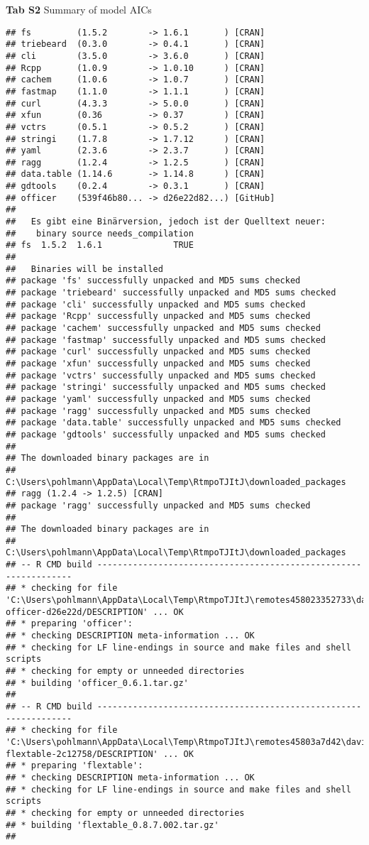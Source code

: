 \documentclass[
]{article}
\begin{document}
\textbf{Tab S2} Summary of model AICs

\begin{verbatim}
## fs         (1.5.2        -> 1.6.1       ) [CRAN]
## triebeard  (0.3.0        -> 0.4.1       ) [CRAN]
## cli        (3.5.0        -> 3.6.0       ) [CRAN]
## Rcpp       (1.0.9        -> 1.0.10      ) [CRAN]
## cachem     (1.0.6        -> 1.0.7       ) [CRAN]
## fastmap    (1.1.0        -> 1.1.1       ) [CRAN]
## curl       (4.3.3        -> 5.0.0       ) [CRAN]
## xfun       (0.36         -> 0.37        ) [CRAN]
## vctrs      (0.5.1        -> 0.5.2       ) [CRAN]
## stringi    (1.7.8        -> 1.7.12      ) [CRAN]
## yaml       (2.3.6        -> 2.3.7       ) [CRAN]
## ragg       (1.2.4        -> 1.2.5       ) [CRAN]
## data.table (1.14.6       -> 1.14.8      ) [CRAN]
## gdtools    (0.2.4        -> 0.3.1       ) [CRAN]
## officer    (539f46b80... -> d26e22d82...) [GitHub]
## 
##   Es gibt eine Binärversion, jedoch ist der Quelltext neuer:
##    binary source needs_compilation
## fs  1.5.2  1.6.1              TRUE
## 
##   Binaries will be installed
## package 'fs' successfully unpacked and MD5 sums checked
## package 'triebeard' successfully unpacked and MD5 sums checked
## package 'cli' successfully unpacked and MD5 sums checked
## package 'Rcpp' successfully unpacked and MD5 sums checked
## package 'cachem' successfully unpacked and MD5 sums checked
## package 'fastmap' successfully unpacked and MD5 sums checked
## package 'curl' successfully unpacked and MD5 sums checked
## package 'xfun' successfully unpacked and MD5 sums checked
## package 'vctrs' successfully unpacked and MD5 sums checked
## package 'stringi' successfully unpacked and MD5 sums checked
## package 'yaml' successfully unpacked and MD5 sums checked
## package 'ragg' successfully unpacked and MD5 sums checked
## package 'data.table' successfully unpacked and MD5 sums checked
## package 'gdtools' successfully unpacked and MD5 sums checked
## 
## The downloaded binary packages are in
##  C:\Users\pohlmann\AppData\Local\Temp\RtmpoTJItJ\downloaded_packages
## ragg (1.2.4 -> 1.2.5) [CRAN]
## package 'ragg' successfully unpacked and MD5 sums checked
## 
## The downloaded binary packages are in
##  C:\Users\pohlmann\AppData\Local\Temp\RtmpoTJItJ\downloaded_packages
## -- R CMD build -----------------------------------------------------------------
## * checking for file 'C:\Users\pohlmann\AppData\Local\Temp\RtmpoTJItJ\remotes458023352733\davidgohel-officer-d26e22d/DESCRIPTION' ... OK
## * preparing 'officer':
## * checking DESCRIPTION meta-information ... OK
## * checking for LF line-endings in source and make files and shell scripts
## * checking for empty or unneeded directories
## * building 'officer_0.6.1.tar.gz'
## 
## -- R CMD build -----------------------------------------------------------------
## * checking for file 'C:\Users\pohlmann\AppData\Local\Temp\RtmpoTJItJ\remotes45803a7d42\davidgohel-flextable-2c12758/DESCRIPTION' ... OK
## * preparing 'flextable':
## * checking DESCRIPTION meta-information ... OK
## * checking for LF line-endings in source and make files and shell scripts
## * checking for empty or unneeded directories
## * building 'flextable_0.8.7.002.tar.gz'
## 
\end{verbatim}
\end{document}
